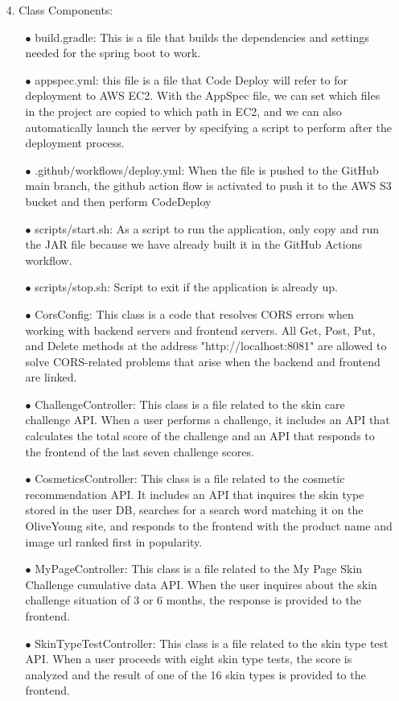 \documentclass[conference]{IEEEtran}
\begin{document}
\begin{itemize}
    \item[4.]  Class Components: 
    \begin{itemize}
        \item[$\bullet$] build.gradle: This is a file that builds the dependencies and settings needed for the spring boot to work.
        \item[$\bullet$] appspec.yml: this file is a file that Code Deploy will refer to for deployment to AWS EC2. With the AppSpec file, we can set which files in the project are copied to which path in EC2, and we can also automatically launch the server by specifying a script to perform after the deployment process.
        \item[$\bullet$] .github/workflows/deploy.yml: When the file is pushed to the GitHub main branch, the github action flow is activated to push it to the AWS S3 bucket and then perform CodeDeploy
        \item[$\bullet$] scripts/start.sh: As a script to run the application, only copy and run the JAR file because we have already built it in the GitHub Actions workflow.
        \item[$\bullet$] scripts/stop.sh: Script to exit if the application is already up.
        \item[$\bullet$] CorsConfig: This class is a code that resolves CORS errors when working with backend servers and frontend servers. All Get, Post, Put, and Delete methods at the address "http://localhost:8081" are allowed to solve CORS-related problems that arise when the backend and frontend are linked.
        \item[$\bullet$] ChallengeController: This class is a file related to the skin care challenge API. When a user performs a challenge, it includes an API that calculates the total score of the challenge and an API that responds to the frontend of the last seven challenge scores.
        \item[$\bullet$] CosmeticsController: This class is a file related to the cosmetic recommendation API. It includes an API that inquires the skin type stored in the user DB, searches for a search word matching it on the OliveYoung site, and responds to the frontend with the product name and image url ranked first in popularity.
        \item[$\bullet$] MyPageController: This class is a file related to the My Page Skin Challenge cumulative data API. When the user inquires about the skin challenge situation of 3 or 6 months, the response is provided to the frontend.
        \item[$\bullet$] SkinTypeTestController: This class is a file related to the skin type test API. When a user proceeds with eight skin type tests, the score is analyzed and the result of one of the 16 skin types is provided to the frontend.

\end{itemize}
\end{itemize}
\end{document}
